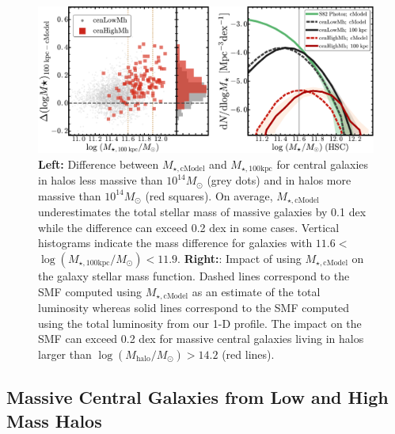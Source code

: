 \documentclass[a4paper,fleqn,usenatbib]{mnras}
\def\mtot{{$M_{\star,100\mathrm{kpc}}$}}
\def\mcmodel{{$M_{\star,\mathrm{cModel}}$}}
\def\logmtot{{$\log (M_{\star,100\mathrm{kpc}}/M_{\odot})$}}
\begin{document}

  \begin{figure}
      \centering 
      \includegraphics[width=\textwidth]{fig/redbcg_smf_new}
      \caption{
          \textbf{Left:} Difference between \mcmodel{} and \mtot{} for central
      	  galaxies in halos less massive than $10^{14} M_{\odot}$ (grey dots) and 
      	  in halos more massive than $10^{14} M_{\odot}$ (red squares). 
          On average, \mcmodel{} underestimates the total stellar mass of massive 
          galaxies by 0.1 dex while the difference can exceed 0.2 dex in some cases.
          Vertical histograms indicate the mass difference for galaxies with
          $11.6<$\logmtot{}$<11.9$. 
          \textbf{Right:}: Impact of using \mcmodel{} on the galaxy stellar mass
          function. 
          Dashed lines correspond to the SMF computed using \mcmodel{} as an estimate
          of the total luminosity whereas solid lines correspond to the SMF computed
          using the total luminosity from our 1-D profile. 
          The impact on the SMF can exceed 0.2 dex for massive central galaxies 
          living in halos larger than $\log (M_{\mathrm{halo}}/M_{\odot}) > 14.2$ (red lines).
          }
      \label{fig:smf1}
  \end{figure}
          
 
\subsection{Massive Central Galaxies from Low and High Mass Halos}
    \label{ssec:mass_central}
    
\end{document}
